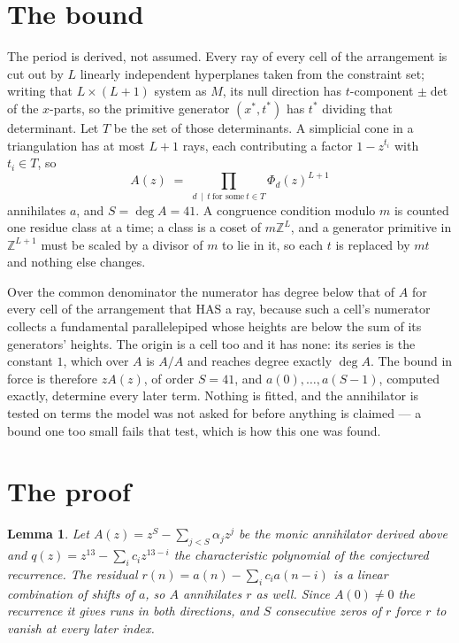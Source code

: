 \documentclass[11pt,a4paper]{article}
\theoremstyle{plain}
\newtheorem{lemma}[theorem]{Lemma}
\theoremstyle{definition}
\begin{document}
\section{The bound}

The period is derived, not assumed. Every ray of every cell of the arrangement is cut out by
$L$ linearly independent hyperplanes taken from the constraint set; writing that $L\times(L+1)$
system as $M$, its null direction has $t$-component $\pm\det$ of the $x$-parts, so the
primitive generator $(x^*,t^*)$ has $t^*$ dividing that determinant. Let $T$ be the set of
those determinants. A simplicial cone in a triangulation has at most $L+1$ rays, each
contributing a factor $1-z^{t_i}$ with $t_i\in T$, so
\[
A(z)\;=\;\prod_{d\,\mid\,t\ \text{for some}\ t\in T}\Phi_d(z)^{L+1}
\]
annihilates $a$, and $S=\deg A=41$. A congruence condition modulo $m$ is counted one residue
class at a time; a class is a coset of $m\mathbb{Z}^L$, and a generator primitive in
$\mathbb{Z}^{L+1}$ must be scaled by a divisor of $m$ to lie in it, so each $t$ is replaced
by $mt$ and nothing else changes.

Over the common denominator the numerator has degree below that of $A$ for every cell of the
arrangement that HAS a ray, because such a cell's numerator collects a fundamental
parallelepiped whose heights are below the sum of its generators' heights. The origin is a cell
too and it has none: its series is the constant $1$, which over $A$ is $A/A$ and reaches degree
exactly $\deg A$. The bound in force is therefore $zA(z)$, of order $S=41$, and
$a(0),\dots,a(S-1)$, computed exactly, determine every later term. Nothing is fitted, and the
annihilator is tested on terms the model was not asked for before anything is claimed --- a
bound one too small fails that test, which is how this one was found.

\section{The proof}

\begin{lemma}\label{lem:crit}
Let $A(z)=z^S-\sum_{j<S}\alpha_jz^{j}$ be the monic annihilator derived above and
$q(z)=z^{13}-\sum_ic_iz^{13-i}$ the characteristic polynomial of the conjectured
recurrence. The residual $r(n)=a(n)-\sum_ic_ia(n-i)$ is a linear combination of shifts of $a$,
so $A$ annihilates $r$ as well. Since $A(0)\ne0$ the recurrence it gives runs in both
directions, and $S$ consecutive zeros of $r$ force $r$ to vanish at every later index.
\end{lemma}
\end{document}
